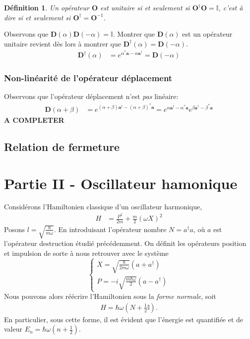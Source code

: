 \documentclass[11pt,oneside,a4paper]{article}
\newcommand{\h}{\ensuremath{\hbar}}
\newtheorem{definition}[theorem]{Définition}
\begin{document}
\begin{definition}
  Un opérateur $\bm{O}$ est unitaire si et seulement si $\bm{O}^\dagger\bm{O} = \mathbb{I}$, c'est à dire si et seulement si $\bm{O}^\dagger = \bm{O}^{-1}$.
\end{definition}

Observons que $\bm{D}(\alpha)\bm{D}(-\alpha) = \mathbb{I}$. Montrer que $\bm{D}(\alpha)$ est un opérateur unitaire revient dès lors à montrer que $\bm{D}^\dagger(\alpha) = \bm{D}(-\alpha)$.
\begin{align}
  \bm{D}^\dagger(\alpha) &= e^{\alpha^*\bm{a}-\alpha\bm{a}^\dagger} = \bm{D}(-\alpha) 
\end{align}

\subsubsection{Non-linéarité de l'opérateur déplacement}

Observons que l'opérateur déplacement n'est \emph{pas} linéaire:
\begin{align}
  \bm{D}(\alpha+\beta) &=  e^{\left(\alpha+\beta\right) \bm{a}^\dagger-\left(\alpha+\beta\right)^*\bm{a}}
  = e^{\alpha \bm{a}^\dagger-\alpha^*\bm{a}} e^{\beta \bm{a}^\dagger-\beta^*\bm{a}}
\end{align}
\textbf{A COMPLETER}

\subsection{Relation de fermeture}

\section{Partie II - Oscillateur hamonique}
\label{part 2}
Considérons l'Hamiltonien classique d'un oscillateur harmonique, 
\begin{align}
  \label{Hamiltonien OH}
  H &= \frac{P^2}{2m} + \frac{m}{2}\left(\omega X\right)^2
\end{align}
Posons $l = \sqrt{\frac{\h}{m\omega}}$. En introduisant l'opérateur nombre $N = a^\dagger a$, où $a$ est l'opérateur destruction étudié précédemment. On définit les opérateurs position et impulsion de sorte à nous retrouver avec le système
\begin{equation}
  \begin{cases}
    X = \sqrt{\frac{\h}{2m\omega}}\left(a+a^\dagger\right)\\
    P = -i\sqrt{\frac{m\h\omega}{2}}\left(a-a^\dagger\right)
  \end{cases}
  \label{P and X}
\end{equation}
Nous pouvons alors réécrire l'Hamiltonien sous la \emph{forme normale}, soit 
\begin{align}
  \label{Hamiltonien OH normale}
  H = \h\omega\left(N+\frac{1}{2}\mathbb{I}\right).
\end{align}
En particulier, sous cette forme, il est évident que l'énergie est quantifiée et de valeur $E_n = \h\omega\left(n+\frac{1}{2}\right)$.
\end{document}
